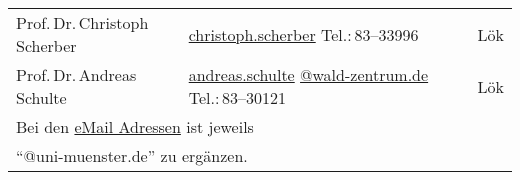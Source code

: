 \begin{small}
\begin{longtable}{p{} p{} p{}}
  Prof.\,Dr.\,Christoph Scherber & \url{christoph.scherber} \newline Tel.:\,83--33996 & Lök\\
  Prof.\,Dr.\,Andreas Schulte & \url{andreas.schulte} \newline \url{@wald-zentrum.de} \newline Tel.:\,83--30121 & Lök\\ 
 \hline
  \multicolumn{3}{l}{Bei den \url{eMail Adressen} ist jeweils} \\
  \multicolumn{3}{l}{``@uni-muenster.de'' zu ergänzen.}\\
\end{longtable}
\end{small}


